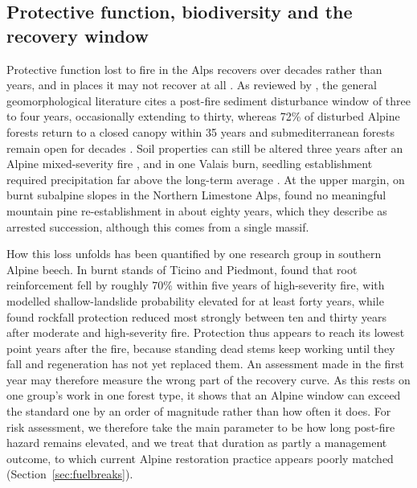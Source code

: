 \documentclass[11pt,a4paper]{article}
\begin{document}
\subsection{Protective function, biodiversity and the recovery window}

Protective function lost to fire in the Alps recovers over decades rather than years, and in places it may not recover at all \citep{maringer_temporal_2016, gehring_shallow_2019, stritih_alternative_2023, degiuli_arrested_2024, moser_potential_2010}. As reviewed by \citet{santi_wildfire_2022}, the general geomorphological literature cites a post-fire sediment disturbance window of three to four years, occasionally extending to thirty, whereas 72\% of disturbed Alpine forests return to a closed canopy within 35 years and submediterranean forests remain open for decades \citep{stritih_alternative_2023}. Soil properties can still be altered three years after an Alpine mixed-severity fire \citep{negri_wildfire_2026}, and in one Valais burn, seedling establishment required precipitation far above the long-term average \citep{moser_potential_2010}. At the upper margin, on burnt subalpine slopes in the Northern Limestone Alps, \citet{degiuli_arrested_2024} found no meaningful mountain pine re-establishment in about eighty years, which they describe as arrested succession, although this comes from a single massif.

How this loss unfolds has been quantified by one research group in southern Alpine beech. In burnt stands of Ticino and Piedmont, \citet{gehring_shallow_2019} found that root reinforcement fell by roughly 70\% within five years of high-severity fire, with modelled shallow-landslide probability elevated for at least forty years, while \citet{maringer_temporal_2016} found rockfall protection reduced most strongly between ten and thirty years after moderate and high-severity fire. Protection thus appears to reach its lowest point years after the fire, because standing dead stems keep working until they fall and regeneration has not yet replaced them. An assessment made in the first year may therefore measure the wrong part of the recovery curve. As this rests on one group's work in one forest type, it shows that an Alpine window can exceed the standard one by an order of magnitude rather than how often it does. For risk assessment, we therefore take the main parameter to be how long post-fire hazard remains elevated, and we treat that duration as partly a management outcome, to which current Alpine restoration practice appears poorly matched (Section~\ref{sec:fuelbreaks}).
\end{document}
